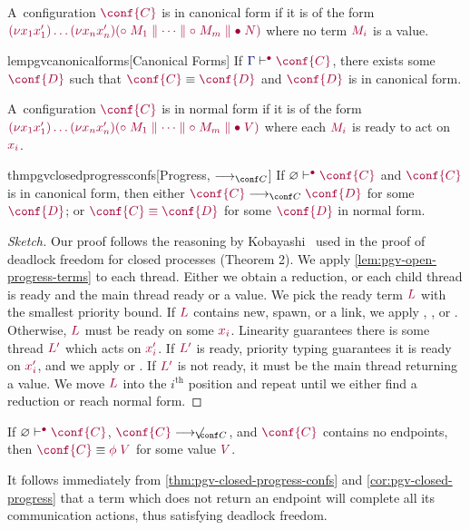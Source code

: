 \documentclass[main.tex]{subfiles}
\begin{document}
\begin{compacttheorems}
  \begin{definition}%
    \label{def:pgv-canonical-forms}
    A~configuration $\tm{\conf{C}}$ is in canonical form if it is of the form
    \(
    \tm{\res{x_1}{x'_1}{\dots\res{x_n}{x'_n}{(\child\;M_1\parallel\dots\parallel\child\;M_m\parallel\main\;N)}}}
    \)
    where no term $\tm{M_i}$ is a value.
  \end{definition}
  \begin{restatablelemma}{lempgvcanonicalforms}[Canonical Forms]%
    \label{lem:pgv-canonical-forms}
    If $\cseq[\main]{\ty{\Gamma}}{\conf{C}}$, there exists some $\tm{\conf{D}}$ such that $\tm{\conf{C}}\equiv\tm{\conf{D}}$ and $\tm{\conf{D}}$ is in canonical form.
  \end{restatablelemma}
  \begin{definition}%
    A~configuration $\tm{\conf{C}}$ is in normal form if it is of the form
    \(
    \tm{\res{x_1}{x'_1}{\dots\res{x_n}{x'_n}{(\child\;M_1\parallel\dots\parallel\child\;M_m\parallel\main\;V)}}}
    \)
    where each $\tm{M_i}$ is ready to act on $\tm{x_i}$.
  \end{definition}
  \begin{restatabletheorem}{thmpgvclosedprogressconfs}[Progress, $\cred$]%
    \label{thm:pgv-closed-progress-confs}
    If $\cseq[\main]{\emptyenv}{\conf{C}}$ and $\tm{\conf{C}}$ is in canonical form, then either $\tm{\conf{C}}\cred\tm{\conf{D}}$ for some $\tm{\conf{D}}$; or $\tm{\conf{C}\equiv\conf{D}}$ for some $\tm{\conf{D}}$ in normal form.
  \end{restatabletheorem}
  \begin{proof}[Sketch]
    Our proof follows the reasoning by Kobayashi~\cite{kobayashi06} used in the proof of deadlock freedom for closed processes (Theorem 2). We apply \cref{lem:pgv-open-progress-terms} to each thread. Either we obtain a reduction, or each child thread is ready and the main thread ready or a value. We pick the ready term $\tm{L}$ with the smallest priority bound. If $\tm{L}$ contains new, spawn, or a link, we apply , , or . Otherwise, $\tm{L}$ must be ready on some $\tm{x_i}$. Linearity guarantees there is some thread  $\tm{L'}$ which acts on $\tm{x'_i}$. If $\tm{L'}$ is ready, priority typing guarantees it is ready on $\tm{x'_i}$, and we apply  or . If $\tm{L'}$ is not ready, it must be the main thread returning a value. We move $\tm{L}$ into the $i^{\text{th}}$ position and repeat until we either find a reduction or reach normal form.
  \end{proof}
  \begin{corollary}%
    \label{cor:pgv-closed-progress}
    If $\cseq[\main]{\emptyenv}{\conf{C}}$, $\tm{\conf{C}}\centernot\cred$, and $\tm{\conf{C}}$ contains no endpoints, then $\tm{\conf{C}}\equiv\tm{\phi\;V}$ for some value $\tm{V}$.
  \end{corollary}
\end{compacttheorems}
It follows immediately from \cref{thm:pgv-closed-progress-confs} and \cref{cor:pgv-closed-progress} that a term which does not return an endpoint will complete all its communication actions, thus satisfying deadlock freedom.
\end{document}
